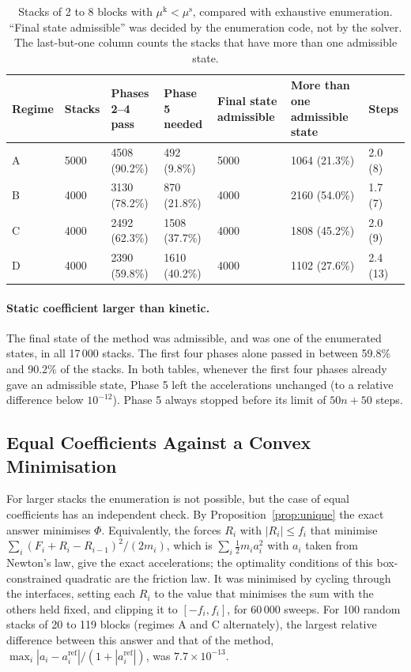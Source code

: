 \documentclass[11pt,a4paper]{article}
\begin{document}
\begin{table}[ht]
\centering\small
\caption{Stacks of 2 to 8 blocks with $\mu^{\mathrm k}<\mu^{\mathrm s}$, compared with exhaustive enumeration. ``Final state admissible'' was decided by the enumeration code, not by the solver. The last-but-one column counts the stacks that have more than one admissible state.}\label{tab:small-unequal}
\begin{tabular}{@{}lR{1.1cm}R{2.3cm}R{2.3cm}R{1.9cm}R{2.3cm}R{1.5cm}@{}}
\toprule
Regime & Stacks & Phases 2--4 pass & Phase 5 needed & Final state admissible & More than one admissible state & Steps\\
\midrule
A & 5000 & 4508 (90.2\%) & 492 (9.8\%) & 5000 & 1064 (21.3\%) & 2.0 (8) \\
B & 4000 & 3130 (78.2\%) & 870 (21.8\%) & 4000 & 2160 (54.0\%) & 1.7 (7) \\
C & 4000 & 2492 (62.3\%) & 1508 (37.7\%) & 4000 & 1808 (45.2\%) & 2.0 (9) \\
D & 4000 & 2390 (59.8\%) & 1610 (40.2\%) & 4000 & 1102 (27.6\%) & 2.4 (13) \\
\bottomrule
\end{tabular}
\end{table}


\paragraph{Static coefficient larger than kinetic.} The final state of the method was admissible, and was one of the enumerated states, in all 17\,000 stacks. The first four phases alone passed in between 59.8\% and 90.2\% of the stacks. In both tables, whenever the first four phases already gave an admissible state, Phase 5 left the accelerations unchanged (to a relative difference below $10^{-12}$). Phase 5 always stopped before its limit of $50n+50$ steps.

\subsection{Equal Coefficients Against a Convex Minimisation}\label{sec:convex}

For larger stacks the enumeration is not possible, but the case of equal coefficients has an independent check. By Proposition~\ref{prop:unique} the exact answer minimises $\Phi$. Equivalently, the forces $R_i$ with $|R_i|\le f_i$ that minimise $\sum_i(F_i+R_i-R_{i-1})^2/(2m_i)$, which is $\sum_i\tfrac12 m_ia_i^2$ with $a_i$ taken from Newton's law, give the exact accelerations; the optimality conditions of this box-constrained quadratic are the friction law. It was minimised by cycling through the interfaces, setting each $R_i$ to the value that minimises the sum with the others held fixed, and clipping it to $[-f_i,f_i]$, for $60\,000$ sweeps. For 100 random stacks of 20 to 119 blocks (regimes A and C alternately), the largest relative difference between this answer and that of the method, $\max_i|a_i-a_i^{\mathrm{ref}}|/(1+|a_i^{\mathrm{ref}}|)$, was $7.7\times10^{-13}$.
\end{document}

